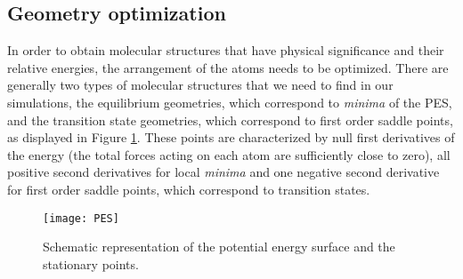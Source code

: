 \subsection*{Geometry optimization}
In order to obtain molecular structures that have physical significance and their relative energies, the arrangement of the atoms needs to be optimized. There are generally two types of molecular structures that we need to find in our simulations, the equilibrium geometries, which correspond to \textit{minima} of the PES, and the transition state geometries, which correspond to first order saddle points, as displayed in Figure \ref{fig:PES}. These points are characterized by null first derivatives of the energy (the total forces acting on each atom are sufficiently close to zero), all positive second derivatives for local \textit{minima} and one negative second derivative for first order saddle points, which correspond to transition states. 

\begin{figure}[!htbp]
	\centering
 	\texttt{[image: PES]}
	\caption{Schematic representation of the potential energy surface and the stationary points.}
	\label{fig:PES}
\end{figure}

